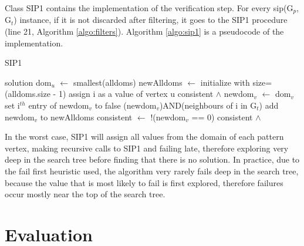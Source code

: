 \documentclass{l4proj}
\begin{document}
Class SIP1 contains the implementation of the verification step. For every \gls{sip}(G$_{p}$, G$_{t}$) instance, if it is not discarded after filtering, it goes to the SIP1 procedure (line 21, Algorithm \ref{algo:filters}). Algorithm \ref{algo:sip1} is a pseudocode of the implementation.

\begin{algorithm}
\centering
\caption{SIP1 }
\label{algo:sip1}
\begin{algorithmic}[1]
 \Return solution 
\EndIf
\State dom$_{u}$ $\gets$ smallest(alldoms) 
\State newAlldoms $\gets$ initialize with size=(alldoms.size - 1)
 
	\State assign i as a value of vertex u
	 
		 \Return consistent $\land$  
        \EndIf
        \State newdom$_{v}$ $\gets$ dom$_{v}$
        \State set i$^{th}$ entry of newdom$_{v}$ to false 
        	\State (newdom$_{v}$)AND(neighbours of i in G$_{t}$) 
        \EndIf
        \State add newdom$_{v}$ to newAlldoms
        \State consistent $\gets$ !(newdom$_{v}$ == 0) 
	\EndFor
    \State consistent $\land$ 
\EndFor
\EndProcedure
\end{algorithmic}
\end{algorithm}
In the worst case, SIP1 will assign all values from the domain of each pattern vertex, making recursive calls to SIP1 and failing late, therefore exploring very deep in the search tree before finding that there is no solution. In practice, due to the fail first heuristic used, the algorithm very rarely fails deep in the search tree, because the value that is most likely to fail is first explored, therefore failures occur mostly near the top of the search tree. 

\chapter{Evaluation}
\label{ch:evaluation}
\end{document}
